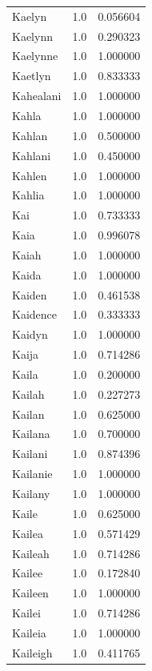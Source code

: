 \documentclass[
  letterpaper,
  DIV=11,
  numbers=noendperiod]{scrreprt}
\begin{document}
\begin{tabular}{lrr}
Kaelyn          &   1.0 &   0.056604 \\
Kaelynn         &   1.0 &   0.290323 \\
Kaelynne        &   1.0 &   1.000000 \\
Kaetlyn         &   1.0 &   0.833333 \\
Kahealani       &   1.0 &   1.000000 \\
Kahla           &   1.0 &   1.000000 \\
Kahlan          &   1.0 &   0.500000 \\
Kahlani         &   1.0 &   0.450000 \\
Kahlen          &   1.0 &   1.000000 \\
Kahlia          &   1.0 &   1.000000 \\
Kai             &   1.0 &   0.733333 \\
Kaia            &   1.0 &   0.996078 \\
Kaiah           &   1.0 &   1.000000 \\
Kaida           &   1.0 &   1.000000 \\
Kaiden          &   1.0 &   0.461538 \\
Kaidence        &   1.0 &   0.333333 \\
Kaidyn          &   1.0 &   1.000000 \\
Kaija           &   1.0 &   0.714286 \\
Kaila           &   1.0 &   0.200000 \\
Kailah          &   1.0 &   0.227273 \\
Kailan          &   1.0 &   0.625000 \\
Kailana         &   1.0 &   0.700000 \\
Kailani         &   1.0 &   0.874396 \\
Kailanie        &   1.0 &   1.000000 \\
Kailany         &   1.0 &   1.000000 \\
Kaile           &   1.0 &   0.625000 \\
Kailea          &   1.0 &   0.571429 \\
Kaileah         &   1.0 &   0.714286 \\
Kailee          &   1.0 &   0.172840 \\
Kaileen         &   1.0 &   1.000000 \\
Kailei          &   1.0 &   0.714286 \\
Kaileia         &   1.0 &   1.000000 \\
Kaileigh        &   1.0 &   0.411765 \\

\end{tabular}
\end{document}
